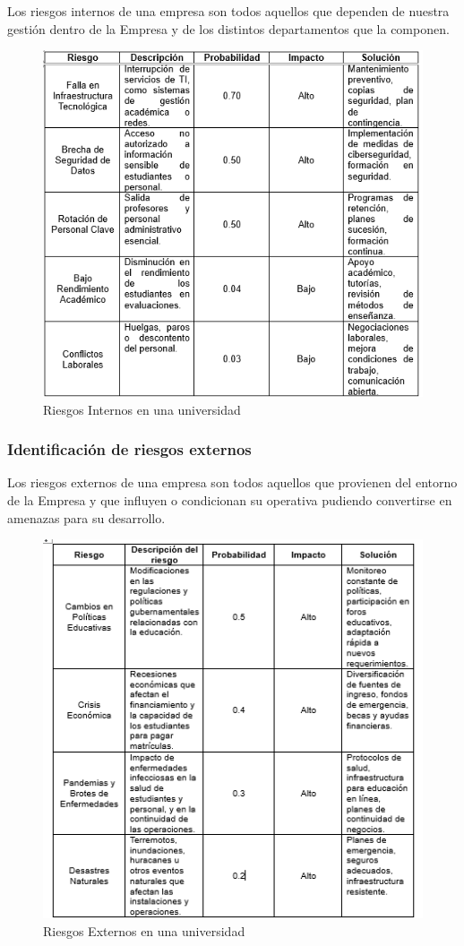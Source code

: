 Los riesgos internos de una empresa son todos aquellos que dependen de nuestra gestión dentro de la Empresa y de los distintos departamentos que la componen. \cite{Riesgos}
%
%
\begin{figure}[H]
    \centering
    \includegraphics[scale=0.4]{10/Img/riesgosInternos.png}
    \caption{Riesgos Internos en una universidad}
    \label{fig:riesgosInternos.png}
\end{figure}
%
%
\subsubsection{Identificación de riesgos externos}

Los riesgos externos de una empresa son todos aquellos que provienen del entorno de la Empresa y que influyen o condicionan su operativa pudiendo convertirse en amenazas para su desarrollo. \cite{Riesgos}
%
%
\begin{figure}[H]
    \centering
    \includegraphics[scale=0.4]{10/Img/riesgosExternos.png}
    \caption{Riesgos Externos en una universidad}
    \label{fig:riesgosExternos.png}
\end{figure}
%
%

